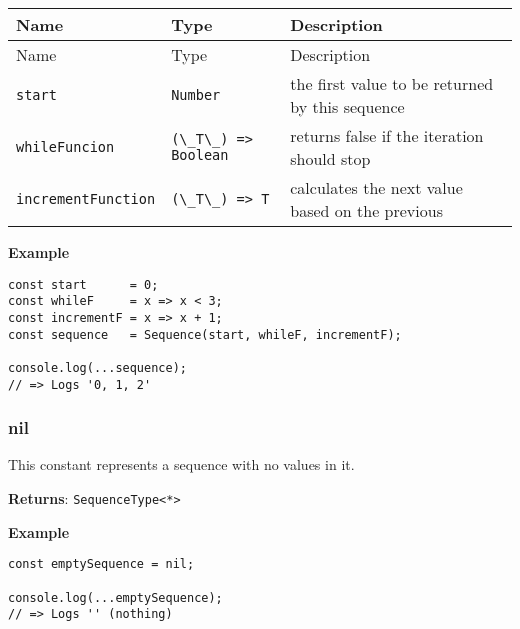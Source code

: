 \begin{longtable}[]{
  >{\raggedright\arraybackslash}p{}
  >{\raggedright\arraybackslash}p{}
  >{\raggedright\arraybackslash}p{}@{}}

\toprule\noalign{}
Name & Type & Description \\
\midrule\noalign{}
\endfirsthead
\toprule\noalign{}
Name & Type & Description \\
\midrule\noalign{}
\endhead
\bottomrule\noalign{}
\endlastfoot
\passthrough{\lstinline!start!} & \passthrough{\lstinline!Number!} & the
first value to be returned by this sequence \\
\passthrough{\lstinline!whileFuncion!} &
\passthrough{\lstinline!(\_T\_) => Boolean!} & returns false if the
iteration should stop \\
\passthrough{\lstinline!incrementFunction!} &
\passthrough{\lstinline!(\_T\_) => T!} & calculates the next value based
on the previous \\
\end{longtable}

\textbf{Example}

\begin{lstlisting}[label=559ccb9f-6cec-4f05-b202-041bc70395bf]
const start      = 0;
const whileF     = x => x < 3;
const incrementF = x => x + 1;
const sequence   = Sequence(start, whileF, incrementF);
                                                       
console.log(...sequence);
// => Logs '0, 1, 2'
\end{lstlisting}

\hypertarget{eb038883-6cbc-4daf-ad04-f8c2e25f9a33}{%
\subsubsection{nil}\label{eb038883-6cbc-4daf-ad04-f8c2e25f9a33}}

This constant represents a sequence with no values in it.

\textbf{Returns}: \passthrough{\lstinline!SequenceType<*>!}

\textbf{Example}

\begin{lstlisting}[label=5c45c9fa-4663-4eae-8965-8bea240591b4]
const emptySequence = nil;
                              
console.log(...emptySequence);
// => Logs '' (nothing)
\end{lstlisting}

